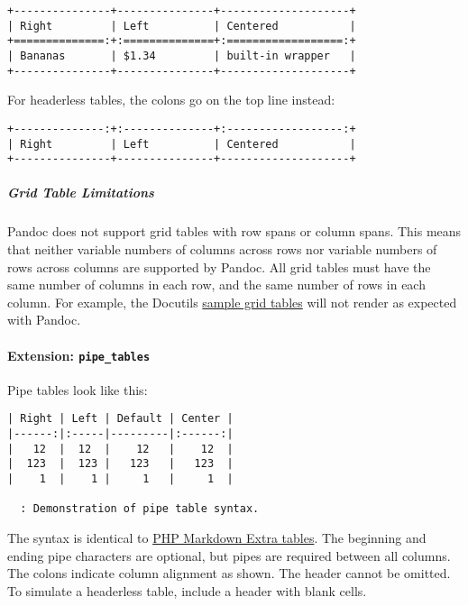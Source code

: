 \documentclass[
]{article}
\begin{document}
\begin{verbatim}
+---------------+---------------+--------------------+
| Right         | Left          | Centered           |
+==============:+:==============+:==================:+
| Bananas       | $1.34         | built-in wrapper   |
+---------------+---------------+--------------------+
\end{verbatim}

For headerless tables, the colons go on the top line instead:

\begin{verbatim}
+--------------:+:--------------+:------------------:+
| Right         | Left          | Centered           |
+---------------+---------------+--------------------+
\end{verbatim}

\hypertarget{grid-table-limitations}{%
\subparagraph{Grid Table Limitations}\label{grid-table-limitations}}

Pandoc does not support grid tables with row spans or column spans. This
means that neither variable numbers of columns across rows nor variable
numbers of rows across columns are supported by Pandoc. All grid tables
must have the same number of columns in each row, and the same number of
rows in each column. For example, the Docutils
\href{https://docutils.sourceforge.io/docs/ref/rst/restructuredtext.html\#grid-tables}{sample
grid tables} will not render as expected with Pandoc.

\hypertarget{extension-pipe_tables}{%
\paragraph{\texorpdfstring{Extension:
\texttt{pipe\_tables}}{Extension: pipe\_tables}}\label{extension-pipe_tables}}

Pipe tables look like this:

\begin{verbatim}
| Right | Left | Default | Center |
|------:|:-----|---------|:------:|
|   12  |  12  |    12   |    12  |
|  123  |  123 |   123   |   123  |
|    1  |    1 |     1   |     1  |

  : Demonstration of pipe table syntax.
\end{verbatim}

The syntax is identical to
\href{https://michelf.ca/projects/php-markdown/extra/\#table}{PHP
Markdown Extra tables}. The beginning and ending pipe characters are
optional, but pipes are required between all columns. The colons
indicate column alignment as shown. The header cannot be omitted. To
simulate a headerless table, include a header with blank cells.
\end{document}
